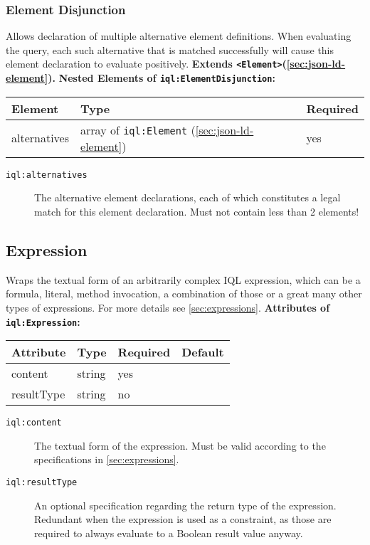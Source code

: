 \documentclass[11pt]{article}
\newcommand{\iql}{IQL\xspace}
\newcommand{\iqlns}{iql:}
\newcommand{\iqlType}[1]{\texttt{\iqlns#1}}
\newcommand{\iqlBaseType}[1]{\texttt{\textless#1\textgreater}}
\newcommand{\desc}[1]{\noindent#1\newline\medskip}
\newcommand{\extends}[2]{\noindent\textbf{Extends #1(#2).}\newline\medskip}
\newenvironment{attributes}[1]{
\noindent\textbf{Attributes of #1:}\newline\medskip
\begin{tabular}{|p{0.3\textwidth}|p{0.20\textwidth}|p{0.20\textwidth}|p{0.17\textwidth}|}
	\hline
	\textbf{Attribute} & \textbf{Type} & \textbf{Required} & \textbf{Default} \\ 
	\hline
	\hline
}{
\end{tabular}
}
\newcommand{\attribute}[4]{
	#1 & #2 & #3 & #4 \\
	\hline
}
\newenvironment{elements}[1]{
\noindent\textbf{Nested Elements of #1:}\newline\medskip
\begin{tabular}{|p{0.3\textwidth}|p{0.42\textwidth}|p{0.17\textwidth}|}
	\hline
	\textbf{Element} & \textbf{Type} & \textbf{Required} \\ 
	\hline
	\hline
}{
\end{tabular}
}
\newcommand{\element}[3]{
#1 & #2 & #3 \\
\hline
}
\begin{document}
\subsubsection{Element Disjunction}
\label{sec:json-ld-element-disjunction}
\desc{Allows declaration of multiple alternative element definitions. When evaluating the query, each such alternative that is matched successfully will cause this element declaration to evaluate positively.}
\extends{\iqlBaseType{Element}}{\ref{sec:json-ld-element}}
\begin{elements}{\iqlType{ElementDisjunction}}
	\element{alternatives}{array of \iqlType{Element} (\ref{sec:json-ld-element})}{yes}
\end{elements}
\begin{description}
	\item[\iqlType{alternatives}] The alternative element declarations, each of which constitutes a legal match for this element declaration. Must not contain less than 2 elements!
\end{description}

\subsection{Expression}
\label{sec:json-ld-expression}
\desc{Wraps the textual form of an arbitrarily complex \iql expression, which can be a formula, literal, method invocation, a combination of those or a great many other types of expressions. For more details see \cref{sec:expressions}.}
\begin{attributes}{\iqlType{Expression}}
	\attribute{content}{string}{yes}{}
	\attribute{resultType}{string}{no}{}
\end{attributes}
\begin{description}
	\item[\iqlType{content}] The textual form of the expression. Must be valid according to the specifications in \cref{sec:expressions}.
	\item[\iqlType{resultType}] An optional specification regarding the return type of the expression. Redundant when the expression is used as a constraint, as those are required to always evaluate to a Boolean result value anyway.
\end{description}
\end{document}
